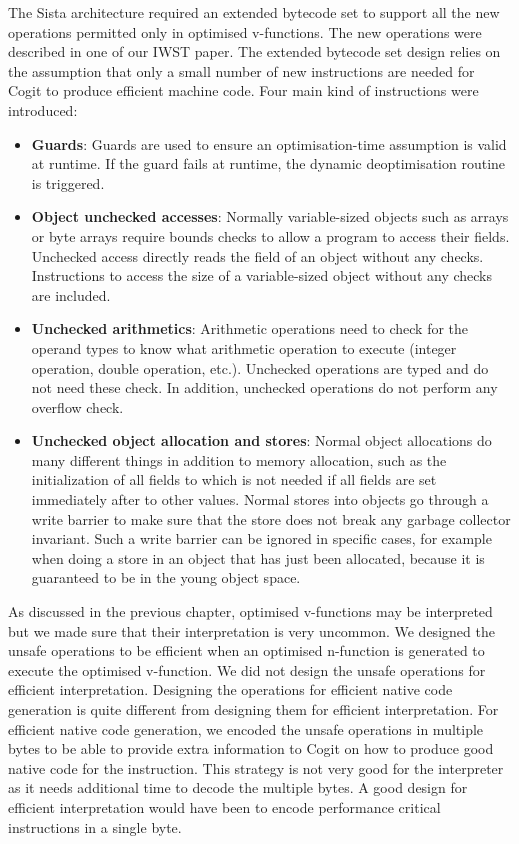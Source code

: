 \documentclass[a4paper,12pt,twoside]{../includes/ThesisStyle}
\begin{document}
The Sista architecture required an extended bytecode set to support all the new operations permitted only in optimised v-functions. The new operations were described in one of our IWST paper\cite{Bera14a}. The extended bytecode set design relies on the assumption that only a small number of new instructions are needed for Cogit to produce efficient machine code. Four main kind of instructions were introduced:
\begin{itemize}
\item \textbf{Guards}: Guards are used to ensure an optimisation-time assumption is valid at runtime. If the guard fails at runtime, the dynamic deoptimisation routine is triggered.
\item \textbf{Object unchecked accesses}: Normally variable-sized objects such as arrays or byte arrays require bounds checks to allow a program to access their fields. Unchecked access directly reads the field of an object without any checks. Instructions to access the size of a variable-sized object without any checks are included.
\item \textbf{Unchecked arithmetics}: Arithmetic operations need to check for the operand types to know what arithmetic operation to execute (integer operation, double operation, etc.). Unchecked operations are typed and do not need these check. In addition, unchecked operations do not perform any overflow check.
\item \textbf{Unchecked object allocation and stores}: Normal object allocations do many different things in addition to memory allocation, such as the initialization of all fields to  which is not needed if all fields are set immediately after to other values. Normal stores into objects go through a write barrier to make sure that the store does not break any garbage collector invariant. Such a write barrier can be ignored in specific cases, for example when doing a store in an object that has just been allocated, because it is guaranteed to be in the young object space.
\end{itemize}

As discussed in the previous chapter, optimised v-functions may be interpreted but we made sure that their interpretation is very uncommon. We designed the unsafe operations to be efficient when an optimised n-function is generated to execute the optimised v-function. We did not design the unsafe operations for efficient interpretation. Designing the operations for efficient native code generation is quite different from designing them for efficient interpretation. For efficient native code generation, we encoded the unsafe operations in multiple bytes to be able to provide extra information to Cogit on how to produce good native code for the instruction. This strategy is not very good for the interpreter as it needs additional time to decode the multiple bytes. A good design for efficient interpretation would have been to encode performance critical instructions in a single byte.
\end{document}

